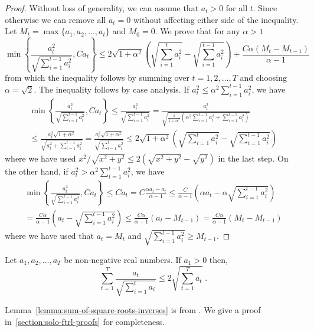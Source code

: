 \begin{proof}
Without loss of generality, we can assume that $a_t > 0$ for all $t$. Since otherwise we
can remove all $a_t = 0$ without affecting either side of the inequality. Let $M_t = \max\{a_1, a_2, \dots, a_t\}$ and $M_0 = 0$.
We prove that for any $\alpha > 1$
$$
\min\left\{ \frac{a_t^2}{\sqrt{\sum_{i=1}^{t-1} a_i^2}}, C a_t \right\}
\le 2 \sqrt{1+\alpha^2} \left( \sqrt{\sum_{i=1}^t a_i^2} - \sqrt{\sum_{i=1}^{t-1} a_i^2} \right) + \frac{C\alpha( M_t  - M_{t-1})}{\alpha - 1}
$$
from which the inequality follows by summing over $t=1,2,\dots,T$ and choosing $\alpha = \sqrt{2}$.
The inequality follows by case analysis. If $a_t^2 \le \alpha^2 \sum_{i=1}^{t-1} a_i^2$, we have
\begin{multline*}
\min\left\{ \frac{a_t^2}{\sqrt{\sum_{i=1}^{t-1} a_i^2}}, C a_t \right\}
\le \frac{a_t^2}{\sqrt{\sum_{i=1}^{t-1} a_i^2}}
= \frac{a_t^2}{\sqrt{\frac{1}{1+\alpha^2} \left( \alpha^2 \sum_{i=1}^{t-1} a_i^2 + \sum_{i=1}^{t-1} a_i^2 \right)}} \\
\le \frac{a_t^2\sqrt{1+\alpha^2}}{\sqrt{ a_t^2 + \sum_{i=1}^{t-1} a_i^2 }}
= \frac{a_t^2\sqrt{1+\alpha^2}}{\sqrt{\sum_{i=1}^t a_i^2}}
\le 2\sqrt{1+\alpha^2} \left( \sqrt{\sum_{i=1}^t a_i^2} - \sqrt{\sum_{i=1}^{t-1} a_i^2} \right)
\end{multline*}
where we have used $x^2/\sqrt{x^2+y^2} \le 2(\sqrt{x^2+y^2} - \sqrt{y^2})$ in the last step.
On the other hand, if $a_t^2 > \alpha^2 \sum_{t=1}^{t-1} a_i^2$, we have
\begin{multline*}
\min\left\{ \frac{a_t^2}{\sqrt{\sum_{i=1}^{t-1} a_i^2}}, C a_t \right\}
\le C a_t
= C \frac{\alpha a_t  - a_t}{\alpha - 1}
\le \frac{C}{\alpha - 1} \left( \alpha a_t  - \alpha \sqrt{\sum_{i=1}^{t-1} a_i^2} \right) \\
= \frac{C\alpha}{\alpha - 1} \left( a_t  - \sqrt{\sum_{i=1}^{t-1} a_i^2} \right)
\le \frac{C\alpha}{\alpha - 1} \left( a_t  - M_{t-1} \right)
= \frac{C\alpha}{\alpha - 1} \left( M_t  - M_{t-1} \right)
\end{multline*}
where we have used that $a_t = M_t$ and $\sqrt{\sum_{i=1}^{t-1} a_i^2} \ge M_{t-1}$.
\end{proof}

\begin{lemma}
\label{lemma:sum-of-square-roots-inverses}
Let $a_1, a_2, \dots, a_T$ be non-negative real numbers. If $a_1 > 0$ then,
$$
\sum_{t=1}^T \frac{a_t}{\sqrt{\sum_{i=1}^t a_i}} \le 2 \sqrt{\sum_{t=1}^T a_t} \; .
$$
\end{lemma}
%
Lemma~\ref{lemma:sum-of-square-roots-inverses} is from
\cite[Lemma~3.5]{Auer-Cesa-Bianchi-Gentile-2002}.  We give a proof
in~\ref{section:solo-ftrl-proofs} for completeness.

